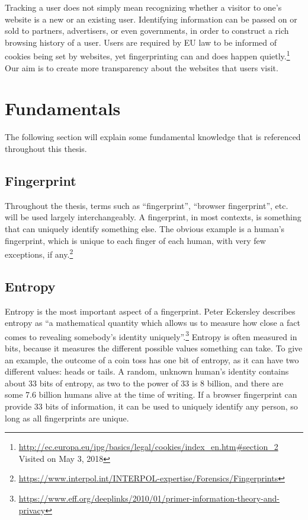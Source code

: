 \documentclass[
    fontsize=12pt,
    headings=small,
    parskip=half,
    bibliography=totoc,
    numbers=noenddot,
    open=any
    ]{scrreprt}
\begin{document}
Tracking a user does not simply mean recognizing whether a visitor to one's website is a new or an existing user.
Identifying information can be passed on or sold to partners, advertisers, or even governments, in order to
construct a rich browsing history of a user. Users are required by EU law to be informed of cookies being set
by websites, yet fingerprinting can and does happen quietly.\footnote{\url{http://ec.europa.eu/ipg/basics/legal/cookies/index\_en.htm\#section\_2} Visited on May 3, 2018}
Our aim is to create more transparency about the websites that users visit.

\section{Fundamentals}
The following section will explain some fundamental knowledge that is
referenced throughout this thesis.

\subsection{Fingerprint}
\label{fundamentals:fingerprint}
Throughout the thesis, terms such as ``fingerprint'', ``browser fingerprint'', etc.
will be used largely interchangeably.
A fingerprint, in most contexts, is something that can uniquely identify something else.
The obvious example is a human's fingerprint, which is unique to each finger of each human,
with very few exceptions, if any.\footnote{\url{https://www.interpol.int/INTERPOL-expertise/Forensics/Fingerprints}}

\subsection{Entropy}
\label{fundamentals:entropy}
Entropy is the most important aspect of a fingerprint.
Peter Eckersley describes entropy as
``a mathematical quantity which allows us to measure how close a fact comes to revealing somebody's identity uniquely''.\footnote{\url{https://www.eff.org/deeplinks/2010/01/primer-information-theory-and-privacy}}
Entropy is often measured in bits, because it measures the different
possible values something can take.
To give an example, the outcome of a coin toss has one bit of entropy,
as it can have two different values: heads or tails.
A random, unknown human's identity contains about 33 bits of entropy,
as two to the power of 33 is 8 billion, and there are some 7.6 billion humans
alive at the time of writing.
If a browser fingerprint can provide 33 bits of information, it can be used
to uniquely identify any person, so long as all fingerprints are unique.
\end{document}
